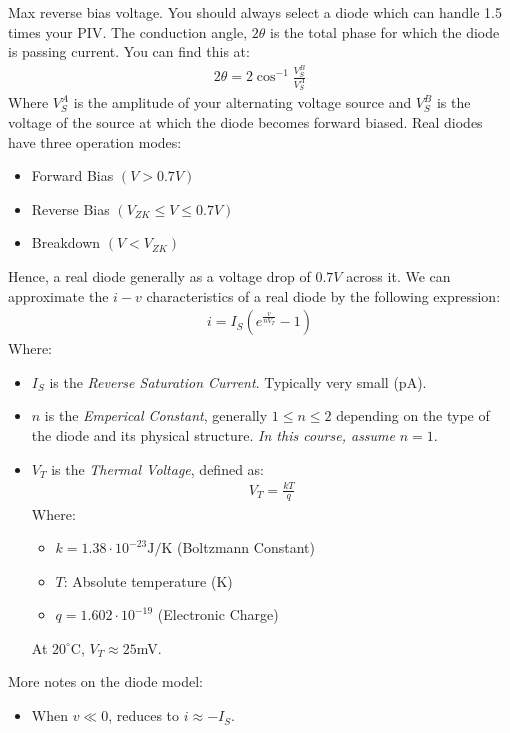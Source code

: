 \documentclass{article}
\begin{document}
 Max reverse bias voltage. You should always select a
diode which can handle 1.5 times your PIV.
\gap
{} The conduction angle, $2\theta$ is the total phase for which the diode
is passing current. You can find this at:
\begin{align*}
  2\theta = 2 \cos^{-1}\frac{V_S^B}{V_S^A}
\end{align*}
Where $V_S^A$ is the amplitude of your alternating voltage source and $V_S^B$ is the voltage
of the source at which the diode becomes forward biased.
\gap
{}
 Real diodes have three operation modes:
\begin{itemize}
\item Forward Bias $(V > 0.7V)$
\item Reverse Bias $(V_{ZK} \leq V \leq 0.7V)$
\item Breakdown $(V < V_{ZK})$
\end{itemize}
Hence, a real diode generally as a voltage drop of $0.7V$ across it.
 We can approximate the $i-v$ characteristics of a real
diode by the following expression:
\begin{align*}
  i = I_S \left(e^{\frac{v}{nV_T}} - 1\right)
\end{align*}
Where:
\begin{itemize}
\item $I_S$ is the \textit{Reverse Saturation Current}. Typically very small (pA).
\item $n$ is the \textit{Emperical Constant}, generally $1 \leq n \leq 2$ depending on
  the type of the diode and its physical structure. \textit{In this course, assume} $n = 1$.
\item $V_T$ is the \textit{Thermal Voltage}, defined as:
  \begin{align*}
    V_T = \frac{kT}{q}
  \end{align*}
  Where:
  \begin{itemize}
  \item $k = 1.38\cdot 10^{-23} \text{J}/\text{K}$ (Boltzmann Constant)
  \item $T$: Absolute temperature (K)
  \item $q = 1.602 \cdot 10^{-19}$ (Electronic Charge)    
  \end{itemize}
  At $20^\circ$C, $V_T \approx 25$mV.
\end{itemize}
More notes on the diode model:
\begin{itemize}
\item When $v \ll 0$, reduces to $i \approx -I_S$.
\end{itemize}
\end{document}
